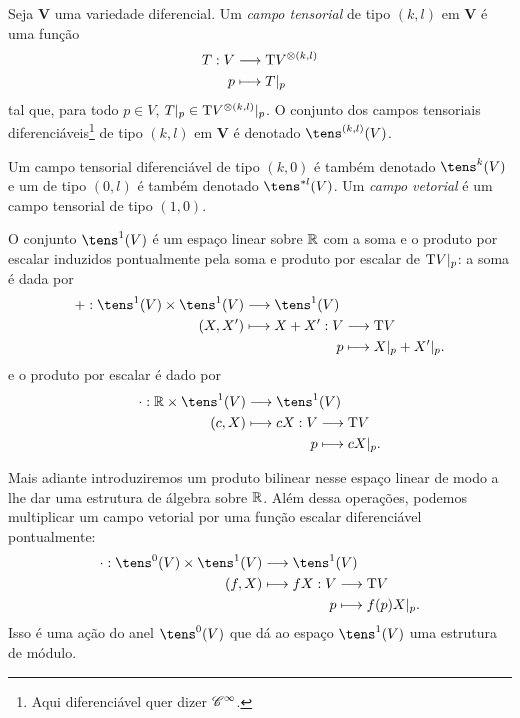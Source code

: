 \begin{defi}
Seja $\bm V$ uma variedade diferencial. Um \emph{campo tensorial} de tipo $(k,l)$ em $\bm V$ é uma função
	\begin{align*}
	{T}: {V} &\longrightarrow {\mathrm{T}V^{\otimes(k,l)}} \\{p} &\longmapsto {T|_p}
	\end{align*}
tal que, para todo $p \in V$, $T|_p \in \mathrm{T} V^{\otimes(k,l)}|_p$. O conjunto dos campos tensoriais diferenciáveis\footnote{Aqui diferenciável quer dizer $\mathscr{C}^\infty$.} de tipo $(k,l)$ em $\bm V$ é denotado $\tens^{(k,l)}(V)$.

Um campo tensorial diferenciável de tipo $(k,0)$ é também denotado $\tens^k(V)$ e um de tipo $(0,l)$ é também denotado $\tens^{* l}(V)$.
Um \emph{campo vetorial} é um campo tensorial de tipo $(1,0)$.
\end{defi}

O conjunto $\tens^1(V)$ é um espaço linear sobre $\mathbb{R}$ com a soma e o produto por escalar induzidos pontualmente pela soma e produto por escalar de $\mathrm{T} V|_p$: a soma é dada por
	\begin{align*}
	\func{+}{\tens^1(V) \times \tens^1(V)}{\tens^1(V)}{(X,X')}{
	\begin{aligned}[t]
	\func{X+X'}{V}{\Tg V}{p}{X|_p + X'|_p.}
	\end{aligned}
	}
	\end{align*}
e o produto por escalar é dado por
	\begin{align*}
	\func{\cdot}{\R \times \tens^1(V)}{\tens^1(V)}{(c,X)}{
	\begin{aligned}[t]
	\func{cX}{V}{\Tg V}{p}{cX|_p.}
	\end{aligned}
	}
	\end{align*}

Mais adiante introduziremos um produto bilinear nesse espaço linear de modo a lhe dar uma estrutura de álgebra sobre $\mathbb{R}$. Além dessa operações, podemos multiplicar um campo vetorial por uma função escalar diferenciável pontualmente:
	\begin{align*}
	\func{\cdot}{\tens^0(V) \times \tens^1(V)}{\tens^1(V)}{(f,X)}{
		\begin{aligned}[t]
		\func{fX}{V}{\Tg V}{p}{f(p)X|_p.}
		\end{aligned}
	}	
	\end{align*}
Isso é uma ação do anel $\tens^0(V)$ que dá ao espaço $\tens^1(V)$ uma estrutura de módulo.

